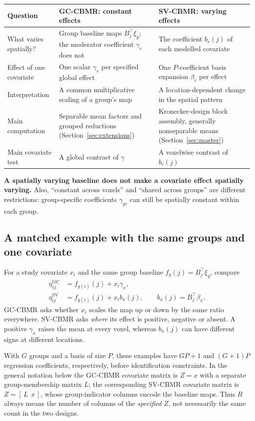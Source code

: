 \documentclass[11pt,a4paper]{article}
\numberwithin{equation}{section}
\begin{document}
\begin{center}\small
\begin{tabularx}{\textwidth}{lTT}
\toprule
Question & GC-CBMR: constant effects & SV-CBMR: varying effects\\
\midrule
What varies spatially? & Group baseline maps $B_j^\top\xi_g$;
the moderator coefficient $\gamma_r$ does not &
The coefficient $b_r(j)$ of each modelled covariate\\
Effect of one covariate & One scalar $\gamma_r$ per specified global effect &
One $P$-coefficient basis expansion $\beta_r$ per effect\\
Interpretation & A common multiplicative scaling of a group's map &
A location-dependent change in the spatial pattern\\
Main computation & Separable mean factors and grouped reductions
(Section~\ref{sec:extensions}) &
Kronecker-design block assembly, generally nonseparable means
(Section~\ref{sec:master})\\
Main covariate test & A global contrast of $\gamma$ &
A voxelwise contrast of $b_r(j)$\\
\bottomrule
\end{tabularx}
\end{center}
\textbf{A spatially varying baseline does not make a covariate effect
spatially varying.} Also, ``constant across voxels'' and ``shared across
groups'' are different restrictions: group-specific coefficients
$\gamma_{gr}$ can still be spatially constant within each group.

\subsection{A matched example with the same groups and one covariate}\label{sec:matched-example}
For a study covariate $x_i$ and the same group baseline
$f_g(j)=B_j^\top\xi_g$, compare
\begin{align}
 \eta_{ij}^{\mathrm{GC}}&=f_{g(i)}(j)+x_i\gamma_x,\\
 \eta_{ij}^{\mathrm{SV}}&=f_{g(i)}(j)+x_i b_x(j),\qquad
 b_x(j)=B_j^\top\beta_x.
\end{align}
GC-CBMR asks whether $x_i$ scales the map up or down by the same ratio
everywhere. SV-CBMR asks \emph{where} its effect is positive, negative or
absent. A positive $\gamma_x$ raises the mean at every voxel, whereas
$b_x(j)$ can have different signs at different locations.

With $G$ groups and a basis of size $P$, these examples have $GP+1$ and
$(G+1)P$ regression coefficients, respectively, before identification
constraints. In the general notation below the GC-CBMR covariate matrix
is $Z=x$ with a separate group-membership matrix $L$; the corresponding
SV-CBMR covariate matrix is $Z=[\,L\ \ x\,]$, whose group-indicator
columns encode the baseline maps. Thus $R$ always means the number of
columns of the \emph{specified} $Z$, not necessarily the same count in
the two designs.
\end{document}
